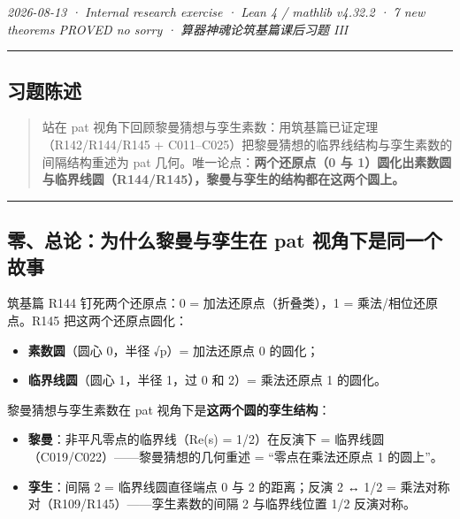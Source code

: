 \documentclass[
]{article}
\providecommand{\tightlist}{%
  \setlength{\itemsep}{0pt}\setlength{\parskip}{0pt}}
\begin{document}
\emph{2026-08-13 · Internal research exercise · Lean 4 / mathlib v4.32.2
· 7 new theorems PROVED no sorry · 算器神魂论筑基篇课后习题 III }

\begin{center}\rule{0.5\linewidth}{0.5pt}\end{center}

\subsection{习题陈述}\label{ux4e60ux9898ux9648ux8ff0}

\begin{quote}
站在 pat 视角下回顾黎曼猜想与孪生素数：用筑基篇已证定理（R142/R144/R145
+ C011--C025）把黎曼猜想的临界线结构与孪生素数的间隔结构重述为 pat
几何。唯一论点：\textbf{两个还原点（0 与
1）圆化出素数圆与临界线圆（R144/R145），黎曼与孪生的结构都在这两个圆上。}
\end{quote}

\begin{center}\rule{0.5\linewidth}{0.5pt}\end{center}

\subsection{零、总论：为什么黎曼与孪生在 pat
视角下是同一个故事}\label{ux96f6ux603bux8bbaux4e3aux4ec0ux4e48ux9eceux66fcux4e0eux5b6aux751fux5728-pat-ux89c6ux89d2ux4e0bux662fux540cux4e00ux4e2aux6545ux4e8b}

筑基篇 R144 钉死两个还原点：0 = 加法还原点（折叠类），1 =
乘法/相位还原点。R145 把这两个还原点圆化：

\begin{itemize}
\tightlist
\item
  \textbf{素数圆}（圆心 0，半径 √p）= 加法还原点 0 的圆化；
\item
  \textbf{临界线圆}（圆心 1，半径 1，过 0 和 2）= 乘法还原点 1 的圆化。
\end{itemize}

黎曼猜想与孪生素数在 pat 视角下是\textbf{这两个圆的孪生结构}：

\begin{itemize}
\tightlist
\item
  \textbf{黎曼}：非平凡零点的临界线（Re(s) = 1/2）在反演下 =
  临界线圆（C019/C022）------黎曼猜想的几何重述 = ``零点在乘法还原点 1
  的圆上''。
\item
  \textbf{孪生}：间隔 2 = 临界线圆直径端点 0 与 2 的距离；反演 2 ↔ 1/2 =
  乘法对称对（R109/R145）------孪生素数的间隔 2 与临界线位置 1/2
  反演对称。
\end{itemize}
\end{document}
